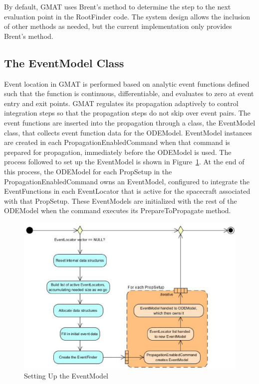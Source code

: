 \documentclass[letterpaper,10pt]{article}
\begin{document}
By default, GMAT uses Brent's method to determine the step to the next
evaluation point in the RootFinder code. The system design allows the inclusion
of other methods as needed, but the current implementation only provides Brent's
method.

\subsection{The EventModel Class}

Event location in GMAT is performed based on analytic event functions defined such that the function is continuous, differentiable, and evaluates to zero at event entry and exit points.  GMAT regulates its propagation adaptively to control integration steps so that the propagation steps do not skip over event pairs.  The event functions are inserted into the propagation through a class, the EventModel class, that collects event function data for the ODEModel.  EventModel instances are created in each PropagationEnabledCommand when that command is prepared for propagation, immediately before the ODEModel is used.  The process followed to set up the EventModel is shown in Figure~\ref{fig:InitializeForEventLocation}.  At the end of this process, the ODEModel for each PropSetup in the PropagationEnabledCommand owns an EventModel, configured to integrate the EventFunctions in each EventLocator that is active for the spacecraft associated with that PropSetup.  These EventModels are initialized with the rest of the ODEModel when the command executes its PrepareToPropagate method.

\begin{figure}[htb]
\begin{center}
\includegraphics[scale=0.5]{./Images/InitializeForEventLocation.eps}
\caption{\label{fig:InitializeForEventLocation}Setting Up the EventModel}
\end{center}
\end{figure} 
\end{document}
